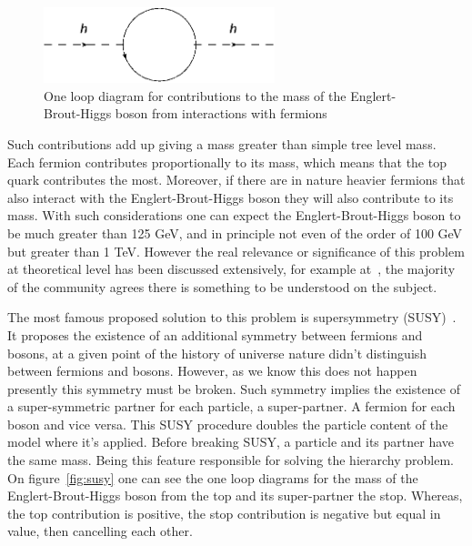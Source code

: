 \begin{figure}[!Hhtbp]
  \begin{center}
    \includegraphics[width=0.6\textwidth]{figs/HierarchyLoop.png}
    \caption{One loop diagram for contributions to the mass of the Englert-Brout-Higgs boson from interactions with fermions}
    \label{fig:oneloophiggs}
  \end{center}
\end{figure}

Such contributions add up giving a mass greater than simple tree level mass. Each fermion contributes proportionally to its mass, which means that the top quark contributes the most. Moreover, if there are in nature heavier fermions that also interact with the Englert-Brout-Higgs boson they will also contribute to its mass. With such considerations one can expect the Englert-Brout-Higgs boson to be much greater than 125 GeV, and in principle not even of the order of 100 GeV but greater than 1 TeV. However the real relevance or significance of this problem at theoretical level has been discussed extensively, for example at~\cite{Jegerlehner:2013nna}, the majority of the community agrees there is something to be understood on the subject. 

The most famous proposed solution to this problem is supersymmetry (SUSY)~\cite{Martin:1997ns}. It proposes the existence of an additional symmetry between fermions and bosons, at a given point of the history of universe nature didn't distinguish between fermions and bosons. However, as we know this does not happen presently this symmetry must be broken. Such symmetry implies the existence of a super-symmetric partner for each particle, a super-partner. A fermion for each boson and vice versa. This SUSY procedure doubles the particle content of the model where it's applied. Before breaking SUSY, a particle and its partner have the same mass. Being this feature responsible for solving the hierarchy problem. On figure~\ref{fig:susy} one can see the one loop diagrams for the mass of the Englert-Brout-Higgs boson from the top and its super-partner the stop. Whereas, the top contribution is positive, the stop contribution is negative but equal in value, then cancelling each other.

